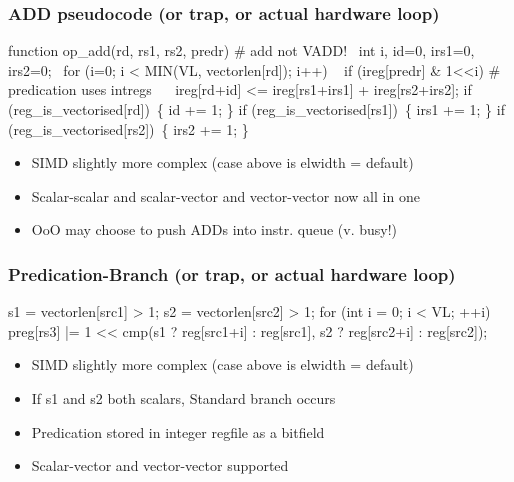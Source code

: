 \documentclass[slidestop]{beamer}
\begin{document}
\begin{frame}[fragile]
\frametitle{ADD pseudocode (or trap, or actual hardware loop)}

\begin{semiverbatim}
function op_add(rd, rs1, rs2, predr) # add not VADD!
  int i, id=0, irs1=0, irs2=0;
  for (i=0; i < MIN(VL, vectorlen[rd]); i++)
    if (ireg[predr] & 1<<i) # predication uses intregs
       ireg[rd+id] <= ireg[rs1+irs1] + ireg[rs2+irs2];
    if (reg_is_vectorised[rd]) \{ id += 1; \}
    if (reg_is_vectorised[rs1]) \{ irs1 += 1; \}
    if (reg_is_vectorised[rs2]) \{ irs2 += 1; \}
\end{semiverbatim}

  \begin{itemize}
   \item SIMD slightly more complex (case above is elwidth = default)
   \item Scalar-scalar and scalar-vector and vector-vector now all in one
   \item OoO may choose to push ADDs into instr. queue (v. busy!)
  \end{itemize}
\end{frame}

\begin{frame}[fragile]
\frametitle{Predication-Branch (or trap, or actual hardware loop)}

\begin{semiverbatim}
s1 = vectorlen[src1] > 1;
s2 = vectorlen[src2] > 1;
for (int i = 0; i < VL; ++i)
   preg[rs3] |= 1 << cmp(s1 ? reg[src1+i] : reg[src1],
                         s2 ? reg[src2+i] : reg[src2]);
\end{semiverbatim}

  \begin{itemize}
   \item SIMD slightly more complex (case above is elwidth = default)  
   \item If s1 and s2 both scalars, Standard branch occurs
   \item Predication stored in integer regfile as a bitfield
   \item Scalar-vector and vector-vector supported
  \end{itemize}
\end{frame}
\end{document}
